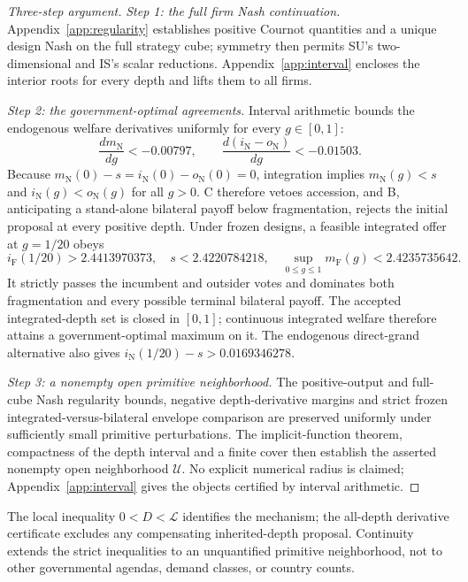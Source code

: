 \documentclass[11pt,a4paper]{article}
\theoremstyle{remark}\newtheorem{remark}[theorem]{Remark}
\newcommand{\N}{\mathrm{N}}\newcommand{\F}{\mathrm{F}}
\newcommand{\loss}{\mathcal L}\newcommand{\vect}[1]{\boldsymbol{#1}}
\begin{document}
\begin{proof}[Three-step argument]
\emph{Step 1: the full firm Nash continuation.} Appendix~\ref{app:regularity} establishes positive Cournot quantities and a unique design Nash on the full strategy cube; symmetry then permits SU's two-dimensional and IS's scalar reductions. Appendix~\ref{app:interval} encloses the interior roots for every depth and lifts them to all firms.

\emph{Step 2: the government-optimal agreements.} Interval arithmetic bounds the endogenous welfare derivatives uniformly for every $g\in[0,1]$:
\begin{equation}\label{eq:cert}
\frac{dm_{\N}}{dg}<-0.00797,\qquad
\frac{d(i_{\N}-o_{\N})}{dg}<-0.01503.
\end{equation}
Because $m_{\N}(0)-s=i_{\N}(0)-o_{\N}(0)=0$, integration implies $m_{\N}(g)<s$ and $i_{\N}(g)<o_{\N}(g)$ for all $g>0$. C therefore vetoes accession, and B, anticipating a stand-alone bilateral payoff below fragmentation, rejects the initial proposal at every positive depth. Under frozen designs, a feasible integrated offer at $g=1/20$ obeys
\begin{equation}\label{eq:frozenCert}
i_{\F}(1/20)>2.4413970373,\quad
s<2.4220784218,\quad
\sup_{0\le g\le1}m_{\F}(g)<2.4235735642.
\end{equation}
It strictly passes the incumbent and outsider votes and dominates both fragmentation and every possible terminal bilateral payoff. The accepted integrated-depth set is closed in $[0,1]$; continuous integrated welfare therefore attains a government-optimal maximum on it. The endogenous direct-grand alternative also gives $i_{\N}(1/20)-s>0.0169346278$.

\emph{Step 3: a nonempty open primitive neighborhood.} The positive-output and full-cube Nash regularity bounds, negative depth-derivative margins and strict frozen integrated-versus-bilateral envelope comparison are preserved uniformly under sufficiently small primitive perturbations. The implicit-function theorem, compactness of the depth interval and a finite cover then establish the asserted nonempty open neighborhood $\mathcal U$. No explicit numerical radius is claimed; Appendix~\ref{app:interval} gives the objects certified by interval arithmetic.
\end{proof}

The local inequality $0<D<\loss$ identifies the mechanism; the all-depth derivative certificate excludes any compensating inherited-depth proposal. Continuity extends the strict inequalities to an unquantified primitive neighborhood, not to other governmental agendas, demand classes, or country counts.
\end{document}
